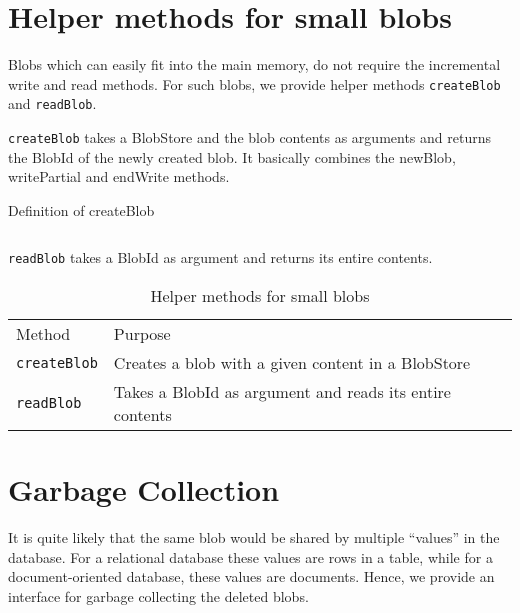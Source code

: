 \section{Helper methods for small blobs}
Blobs which can easily fit into the main memory, do not require the incremental write and read methods. For such blobs, we provide helper methods \texttt{createBlob} and \texttt{readBlob}.

\texttt{createBlob} takes a BlobStore and the blob contents as arguments and returns the BlobId of the newly created blob. It basically combines the newBlob, writePartial and endWrite methods.

\begin{program}
  \caption{Definition of createBlob}
  \label{fig:defcreateblob}
  \inputminted{haskell}{hs/createblob.hs}
\end{program}

\texttt{readBlob} takes a BlobId as argument and returns its entire contents.

\begin{table}[hbt]
\caption{Helper methods for small blobs}
\label{tab:interface-small-blob}
\begin{center}
  \begin{tabularx}{0.91\textwidth}{lX}
    \hline\noalign{\smallskip}
    Method & Purpose \\
    \noalign{\smallskip}
    \hline
    \noalign{\smallskip}
    \texttt{createBlob} & Creates a blob with a given content in a BlobStore \\
    \texttt{readBlob} & Takes a BlobId as argument and reads its entire contents \\
    \hline
  \end{tabularx}
\end{center}
\end{table}

\section{Garbage Collection}
It is quite likely that the same blob would be shared by multiple ``values'' in the database. For a relational database these values are rows in a table, while for a document-oriented database, these values are documents.
Hence, we provide an interface for garbage collecting the deleted blobs.

